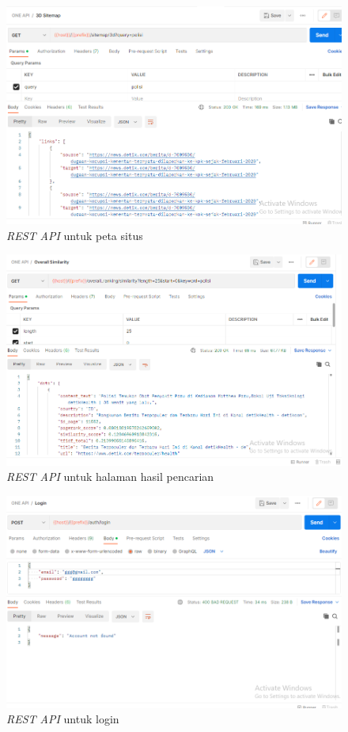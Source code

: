 \begin{figure}[H]
	\centering
	\includegraphics[keepaspectratio, width=13cm]{gambar/rest_3d_sitemap.png}
	\caption{\textit{REST API} untuk peta situs}
	\label{gambar:rest_3d_sitemap.png}
\end{figure}


\begin{figure}[H]
	\centering
	\includegraphics[keepaspectratio, width=13cm]{gambar/rest_search.png}
	\caption{\textit{REST API} untuk halaman hasil pencarian}
	\label{gambar:rest_search.png}
\end{figure}


\begin{figure}[H]
	\centering
	\includegraphics[keepaspectratio, width=13cm]{gambar/rest_login.png}
	\caption{\textit{REST API} untuk login}
	\label{gambar:rest_login.png}
\end{figure}


